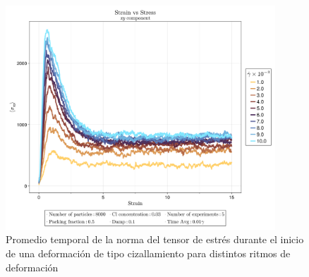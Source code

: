\documentclass[../main.tex]{subfiles}
\begin{document}
\begin{figure}[ht]
    \centering
    \includegraphics[width=0.9\textwidth]{../Figures/system-2025-05-22-194804-CL-0.03/Strain-vs-StressXY.png}
    \caption{Promedio temporal de la norma del tensor de estrés durante el inicio de una deformación de tipo cizallamiento para distintos ritmos de deformación}\label{fig:strain-vs-normstress}
\end{figure}
\end{document}

